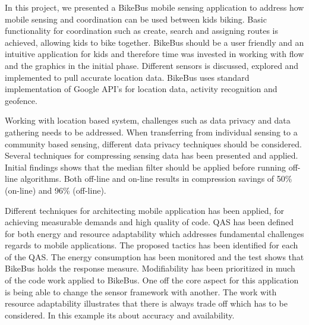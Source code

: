 



In this project, we presented a BikeBus mobile sensing application to address how mobile sensing and coordination can be used between kids biking. Basic functionality for coordination such as create, search and assigning routes is achieved, allowing kids to bike together. BikeBus should be a user friendly and an intuitive application for kids and therefore time was invested in working with flow and the graphics in the initial phase. Different sensors is discussed, explored and implemented to pull accurate location data. BikeBus uses standard implementation of Google API's for location data, activity recognition and geofence.

Working with location based system, challenges such as data privacy and data gathering needs to be addressed. When transferring from individual sensing to a community based sensing, different data privacy techniques should be considered. Several techniques for compressing sensing data has been presented and applied. Initial findings shows that the median filter should be applied before running off-line algorithms. Both off-line and on-line results in compression savings of 50\% (on-line) and 96\% (off-line).

Different techniques for architecting mobile application has been applied, for achieving measurable demands and high quality of code. QAS has been defined for both energy and resource adaptability which addresses fundamental challenges regards to mobile applications. The proposed tactics has been identified for each of the QAS. The energy consumption has been monitored and the test shows that BikeBus holds the response measure. Modifiability has been prioritized in much of the code work applied to BikeBus. One off the core aspect for this application is being able to change the sensor framework with another. The work with resource adaptability illustrates that there is always trade off which has to be considered. In this example its about accuracy and availability.    


